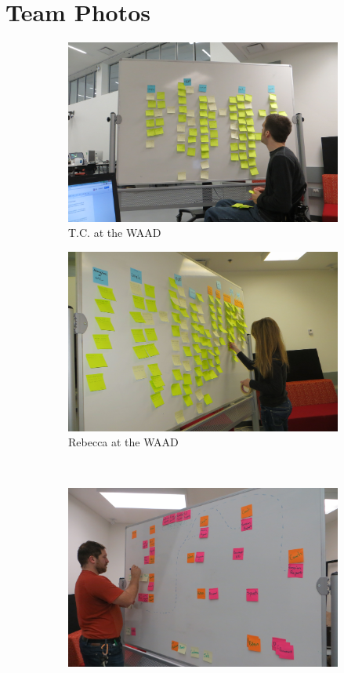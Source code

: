 \documentclass[12pt]{article} %
\begin{document}
\section{Team Photos} %
  \begin{figure}[H]
    \begin{subfigure}{.5\linewidth}
      \centering
      \includegraphics[width=0.95\linewidth]{TeamAtWork1}
      \caption{T.C. at the WAAD}
      \label{fig:team_photo_1}
    \end{subfigure}%
    \begin{subfigure}{.5\linewidth}
      \centering
      \includegraphics[width=0.95\linewidth]{TeamAtWork3}
      \caption{Rebecca at the WAAD}
      \label{fig:team_photo_3}
    \end{subfigure}\\[1ex]
    \begin{subfigure}{\linewidth}
      \centering
      \includegraphics[width=0.55\linewidth]{TeamAtWork4}

\end{subfigure}
\end{figure}
\end{document}
